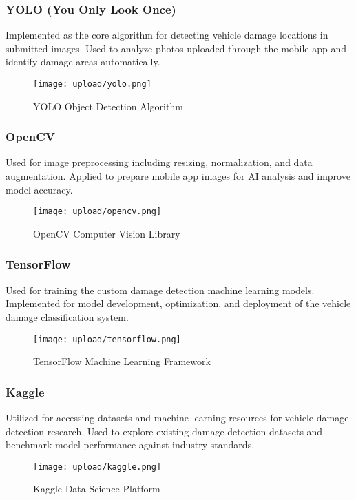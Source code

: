 \documentclass[12pt,a4paper]{report}
\begin{document}
\subsubsection{YOLO (You Only Look Once)}
Implemented as the core algorithm for detecting vehicle damage locations in submitted images. Used to analyze photos uploaded through the mobile app and identify damage areas automatically.

\begin{figure}[H]
    \centering
    \texttt{[image: upload/yolo.png]}
    \caption{YOLO Object Detection Algorithm}
    \label{fig:yolo}
\end{figure}

\subsubsection{OpenCV}
Used for image preprocessing including resizing, normalization, and data augmentation. Applied to prepare mobile app images for AI analysis and improve model accuracy.

\begin{figure}[H]
    \centering
    \texttt{[image: upload/opencv.png]}
    \caption{OpenCV Computer Vision Library}
    \label{fig:opencv}
\end{figure}

\subsubsection{TensorFlow}
Used for training the custom damage detection machine learning models. Implemented for model development, optimization, and deployment of the vehicle damage classification system.

\begin{figure}[H]
    \centering
    \texttt{[image: upload/tensorflow.png]}
    \caption{TensorFlow Machine Learning Framework}
    \label{fig:tensorflow}
\end{figure}

\subsubsection{Kaggle}
Utilized for accessing datasets and machine learning resources for vehicle damage detection research. Used to explore existing damage detection datasets and benchmark model performance against industry standards.

\begin{figure}[H]
    \centering
    \texttt{[image: upload/kaggle.png]}
    \caption{Kaggle Data Science Platform}
    \label{fig:kaggle}
\end{figure}
\end{document}
